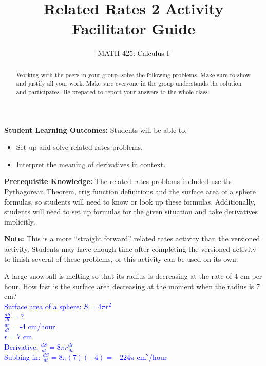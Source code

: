 \documentclass{ximera}
\title{Related Rates 2 Activity Facilitator Guide}
\author{MATH 425: Calculus I}
\begin{document}
\begin{abstract}
   Working with the peers in your group, solve the following problems. Make sure to show and justify all your work. Make sure everyone in the group understands the solution and participates. Be prepared to report your answers to the whole class. 
\end{abstract}
\maketitle

\textbf{Student Learning Outcomes:}
Students will be able to:
    \begin{itemize}
        \item Set up and solve related rates problems.
        \item Interpret the meaning of derivatives in context.
    \end{itemize}

\textbf{Prerequisite Knowledge:} The related rates problems included use the Pythagorean Theorem, trig function definitions and the surface area of a sphere formulas, so students will need to know or look up these formulas.  Additionally, students will need to set up formulas for the given situation and take derivatives implicitly. 

\textbf{Note:} This is a more ``straight forward'' related rates activity than the versioned activity.  Students may have enough time after completing the versioned activity to finish several of these problems, or this activity can be used on its own.

\begin{exercise}
    A large snowball is melting so that its radius is decreasing at the rate of 4 cm per hour.  How fast is the surface area decreasing at the moment when the radius is 7 cm? \\
    \textcolor{blue}{Surface area of a sphere: $S=4\pi r^2$\\
    $\frac{dS}{dt}=?$\\
    $\frac{dr}{dt}=$-4 cm/hour\\
    $r=7$ cm\\
    Derivative: $\frac{dS}{dt}=8\pi r\frac{dr}{dt}$\\
    Subbing in: $\frac{dS}{dt}=8\pi(7)(-4)=-224\pi$ cm$^2$/hour } 
\end{exercise}
    
\end{document}
